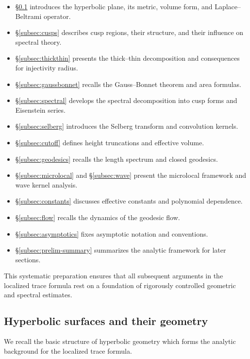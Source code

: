 \begin{itemize}
  \item \S\ref{subsec:surfaces} introduces the hyperbolic plane, its metric,
        volume form, and Laplace--Beltrami operator.
  \item \S\ref{subsec:cusps} describes cusp regions, their structure, and their
        influence on spectral theory.
  \item \S\ref{subsec:thickthin} presents the thick--thin decomposition and
        consequences for injectivity radius.
  \item \S\ref{subsec:gaussbonnet} recalls the Gauss--Bonnet theorem and area formulas.
  \item \S\ref{subsec:spectral} develops the spectral decomposition into cusp forms
        and Eisenstein series.
  \item \S\ref{subsec:selberg} introduces the Selberg transform and convolution kernels.
  \item \S\ref{subsec:cutoff} defines height truncations and effective volume.
  \item \S\ref{subsec:geodesics} recalls the length spectrum and closed geodesics.
  \item \S\ref{subsec:microlocal} and \S\ref{subsec:wave} present the microlocal
        framework and wave kernel analysis.
  \item \S\ref{subsec:constants} discusses effective constants and polynomial dependence.
  \item \S\ref{subsec:flow} recalls the dynamics of the geodesic flow.
  \item \S\ref{subsec:asymptotics} fixes asymptotic notation and conventions.
  \item \S\ref{subsec:prelim-summary} summarizes the analytic framework for later sections.
\end{itemize}

This systematic preparation ensures that all subsequent arguments in the
localized trace formula rest on a foundation of rigorously controlled
geometric and spectral estimates.

\subsection{Hyperbolic surfaces and their geometry}\label{subsec:surfaces}

We recall the basic structure of hyperbolic geometry which forms the analytic background for the localized trace formula.

